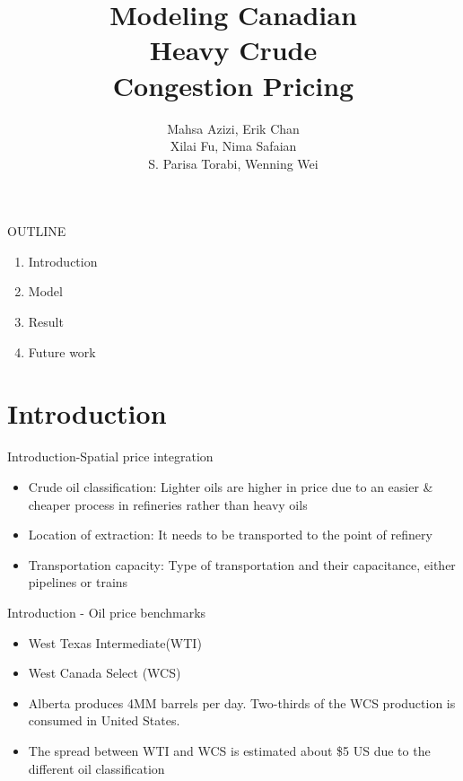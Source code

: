 \documentclass[aspectratio = 169]{beamer}
\author[]{Mahsa Azizi, Erik Chan\\ Xilai Fu, Nima Safaian\\ S. Parisa Torabi, Wenning Wei}
\title{Modeling Canadian\\ Heavy Crude\\ Congestion Pricing}
\begin{document}
\begin{frame}{OUTLINE}
\begin{enumerate}
\setlength\itemsep{2em}
    \item\Large{Introduction}
    \item Model
    \item Result
    \item Future work
\end{enumerate}
\end{frame}

\section{Introduction}
\begin{frame}{Introduction-Spatial price integration}

\begin{itemize}
\setlength\itemsep{2em}
    \item \Large{Crude oil classification: Lighter oils are higher in price due to an easier \&  cheaper process in refineries rather than heavy oils }
    \item \Large{Location of extraction: It needs to be transported to the point of refinery}
    \item \Large{Transportation capacity: Type of transportation and their capacitance, either pipelines or trains}

\end{itemize}
\end{frame}




\begin{frame}{Introduction - Oil price benchmarks}
    \begin{itemize}
\setlength\itemsep{2em}
    \item \Large{West Texas Intermediate(WTI)}
    \item \Large{West Canada Select (WCS)}
    \item Alberta produces 4MM barrels per day. Two-thirds of the WCS production is consumed in United States.
    \item The spread between WTI and WCS is estimated about \$5 US due to the different oil classification
\end{itemize}
\end{frame}
\end{document}

